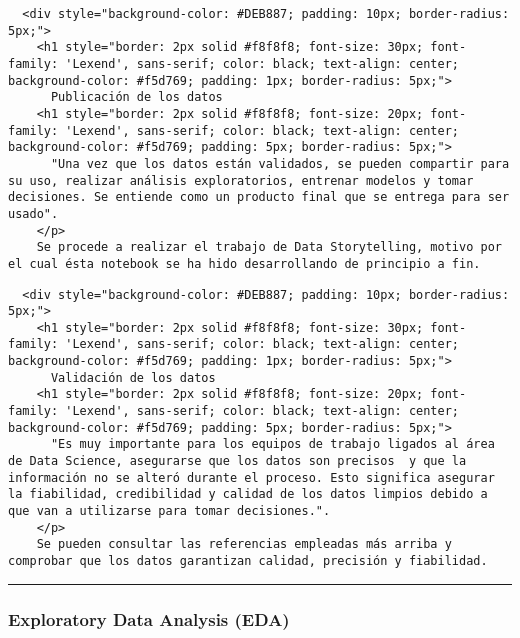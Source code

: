 \documentclass[11pt]{article}
\begin{document}
    \begin{verbatim}
  <div style="background-color: #DEB887; padding: 10px; border-radius: 5px;">
    <h1 style="border: 2px solid #f8f8f8; font-size: 30px; font-family: 'Lexend', sans-serif; color: black; text-align: center; background-color: #f5d769; padding: 1px; border-radius: 5px;">
      Publicación de los datos
    <h1 style="border: 2px solid #f8f8f8; font-size: 20px; font-family: 'Lexend', sans-serif; color: black; text-align: center; background-color: #f5d769; padding: 5px; border-radius: 5px;">
      "Una vez que los datos están validados, se pueden compartir para su uso, realizar análisis exploratorios, entrenar modelos y tomar decisiones. Se entiende como un producto final que se entrega para ser usado".
    </p>
    Se procede a realizar el trabajo de Data Storytelling, motivo por el cual ésta notebook se ha hido desarrollando de principio a fin.
\end{verbatim}

    \begin{verbatim}
  <div style="background-color: #DEB887; padding: 10px; border-radius: 5px;">
    <h1 style="border: 2px solid #f8f8f8; font-size: 30px; font-family: 'Lexend', sans-serif; color: black; text-align: center; background-color: #f5d769; padding: 1px; border-radius: 5px;">
      Validación de los datos
    <h1 style="border: 2px solid #f8f8f8; font-size: 20px; font-family: 'Lexend', sans-serif; color: black; text-align: center; background-color: #f5d769; padding: 5px; border-radius: 5px;">
      "Es muy importante para los equipos de trabajo ligados al área de Data Science, asegurarse que los datos son precisos  y que la información no se alteró durante el proceso. Esto significa asegurar la fiabilidad, credibilidad y calidad de los datos limpios debido a que van a utilizarse para tomar decisiones.".
    </p>
    Se pueden consultar las referencias empleadas más arriba y comprobar que los datos garantizan calidad, precisión y fiabilidad.
\end{verbatim}

    \begin{center}\rule{0.5\linewidth}{0.5pt}\end{center}

\hypertarget{exploratory-data-analysis-eda}{%
\subsubsection{Exploratory Data Analysis
(EDA)}\label{exploratory-data-analysis-eda}}
\end{document}
